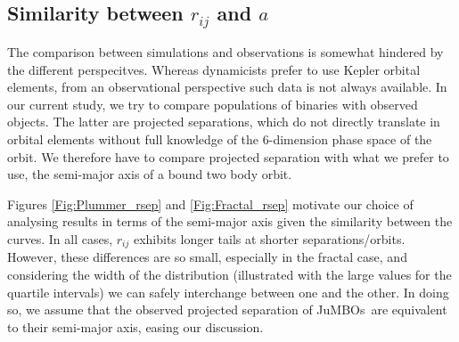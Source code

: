 \documentclass[submission,phys]{lib/SciPost}
\newcommand{\jumbos}{\mbox{JuMBOs}}
\begin{document}
\begin{appendix}
  \section{Similarity between $r_{ij}$ and $a$}\label{Appendix:A}

  The comparison between simulations and observations is somewhat
  hindered by the different perspecitves. Whereas dynamicists prefer
  to use Kepler orbital elements, from an observational perspective
  such data is not always available. In our current study, we try to
  compare populations of binaries with observed objects. The latter
  are projected separations, which do not directly translate in
  orbital elements without full knowledge of the 6-dimension phase
  space of the orbit. We therefore have to compare projected separation
  with what we prefer to use, the semi-major axis of a bound two body
  orbit.

  Figures \ref{Fig:Plummer_rsep} and \ref{Fig:Fractal_rsep} motivate
  our choice of analysing results in terms of the semi-major axis
  given the similarity between the curves.  In all cases, $r_{ij}$
  exhibits longer tails at shorter separations/orbits. However, these
  differences are so small, especially in the fractal case, and
  considering the width of the distribution (illustrated with the
  large values for the quartile intervals) we can safely interchange
  between one and the other. In doing so, we assume that the observed
  projected separation of \jumbos\, are equivalent to their semi-major
  axis, easing our discussion.
    

\end{appendix}
\end{document}
